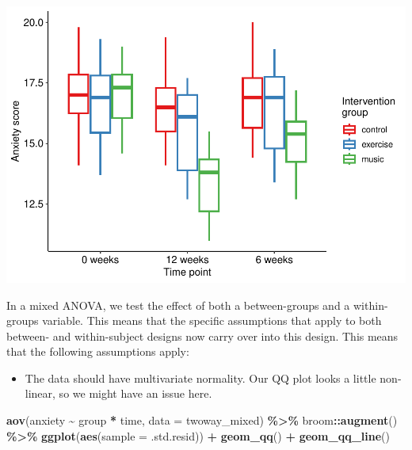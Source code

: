 \documentclass[
]{book}
\newenvironment{Shaded}{\begin{snugshade}}{\end{snugshade}}
\newcommand{\AttributeTok}[1]{\textcolor[rgb]{0.13,0.29,0.53}{#1}}
\newcommand{\FunctionTok}[1]{\textcolor[rgb]{0.13,0.29,0.53}{\textbf{#1}}}
\newcommand{\NormalTok}[1]{#1}
\newcommand{\SpecialCharTok}[1]{\textcolor[rgb]{0.81,0.36,0.00}{\textbf{#1}}}
\providecommand{\tightlist}{%
  \setlength{\itemsep}{0pt}\setlength{\parskip}{0pt}}
\begin{document}
\includegraphics{_main_files/figure-latex/unnamed-chunk-259-1.pdf}

In a mixed ANOVA, we test the effect of both a between-groups and a within-groups variable. This means that the specific assumptions that apply to both between- and within-subject designs now carry over into this design. This means that the following assumptions apply:

\begin{itemize}
\tightlist
\item
  The data should have multivariate normality. Our QQ plot looks a little non-linear, so we might have an issue here.
\end{itemize}

\begin{Shaded}
\begin{Highlighting}[]
\FunctionTok{aov}\NormalTok{(anxiety }\SpecialCharTok{\textasciitilde{}}\NormalTok{ group }\SpecialCharTok{*}\NormalTok{ time, }\AttributeTok{data =}\NormalTok{ twoway\_mixed) }\SpecialCharTok{\%\textgreater{}\%}
\NormalTok{  broom}\SpecialCharTok{::}\FunctionTok{augment}\NormalTok{() }\SpecialCharTok{\%\textgreater{}\%}
  \FunctionTok{ggplot}\NormalTok{(}\FunctionTok{aes}\NormalTok{(}\AttributeTok{sample =}\NormalTok{ .std.resid)) }\SpecialCharTok{+}
  \FunctionTok{geom\_qq}\NormalTok{() }\SpecialCharTok{+}
  \FunctionTok{geom\_qq\_line}\NormalTok{()}
\end{Highlighting}
\end{Shaded}
\end{document}
